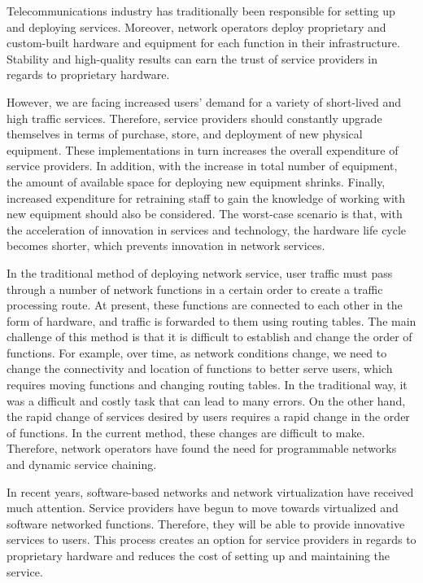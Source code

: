Telecommunications industry has traditionally been responsible for setting up and deploying services. Moreover, network operators deploy proprietary and custom-built hardware and equipment for each function in their infrastructure. Stability and high-quality results can earn the trust of service providers in regards to proprietary hardware.

However, we are facing increased users' demand for a variety of short-lived and high traffic services.
Therefore, service providers should constantly upgrade themselves in terms of purchase, store, and deployment of new physical equipment.
These implementations in turn increases the overall expenditure of service providers.
In addition, with the increase in total number of equipment, the amount of available space for deploying new equipment shrinks.
Finally, increased expenditure for retraining staff to gain the knowledge of working with new equipment should also be considered.
The worst-case scenario is that, with the acceleration of innovation in services and technology, the hardware life cycle becomes shorter, which prevents innovation in network services.

In the traditional method of deploying network service, user traffic must pass through a number of network functions in a certain order to create a traffic processing route.
At present, these functions are connected to each other in the form of hardware, and traffic is forwarded to them using routing tables.
The main challenge of this method is that it is difficult to establish and change the order of functions.
For example, over time, as network conditions change, we need to change the connectivity and location of functions to better serve users,
which requires moving functions and changing routing tables.
In the traditional way, it was a difficult and costly task that can lead to many errors.
On the other hand, the rapid change of services desired by users requires a rapid change in the order of functions.
In the current method, these changes are difficult to make.
Therefore, network operators have found the need for programmable networks and dynamic service chaining.

In recent years, software-based networks and network virtualization have received much attention.
Service providers have begun to move towards virtualized and software networked functions.
Therefore, they will be able to provide innovative services to users. This process creates an option for service providers in regards to proprietary hardware and reduces the cost of setting up and maintaining the service.

